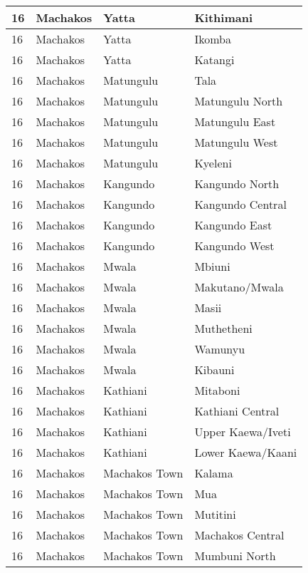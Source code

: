 \begin{table}[!ht]
\begin{tabular}{|l|l|l|l|}
        16 & Machakos & Yatta & Kithimani \\ \hline
        16 & Machakos & Yatta & Ikomba \\ \hline
        16 & Machakos & Yatta & Katangi \\ \hline
        16 & Machakos & Matungulu & Tala \\ \hline
        16 & Machakos & Matungulu & Matungulu North \\ \hline
        16 & Machakos & Matungulu & Matungulu East \\ \hline
        16 & Machakos & Matungulu & Matungulu West \\ \hline
        16 & Machakos & Matungulu & Kyeleni \\ \hline
        16 & Machakos & Kangundo & Kangundo North \\ \hline
        16 & Machakos & Kangundo & Kangundo Central \\ \hline
        16 & Machakos & Kangundo & Kangundo East \\ \hline
        16 & Machakos & Kangundo & Kangundo West \\ \hline
        16 & Machakos & Mwala & Mbiuni \\ \hline
        16 & Machakos & Mwala & Makutano/Mwala \\ \hline
        16 & Machakos & Mwala & Masii \\ \hline
        16 & Machakos & Mwala & Muthetheni \\ \hline
        16 & Machakos & Mwala & Wamunyu \\ \hline
        16 & Machakos & Mwala & Kibauni \\ \hline
        16 & Machakos & Kathiani & Mitaboni \\ \hline
        16 & Machakos & Kathiani & Kathiani Central \\ \hline
        16 & Machakos & Kathiani & Upper Kaewa/Iveti \\ \hline
        16 & Machakos & Kathiani & Lower Kaewa/Kaani \\ \hline
        16 & Machakos & Machakos Town & Kalama \\ \hline
        16 & Machakos & Machakos Town & Mua \\ \hline
        16 & Machakos & Machakos Town & Mutitini \\ \hline
        16 & Machakos & Machakos Town & Machakos Central \\ \hline
        16 & Machakos & Machakos Town & Mumbuni North \\ \hline

\end{tabular}
\end{table}
